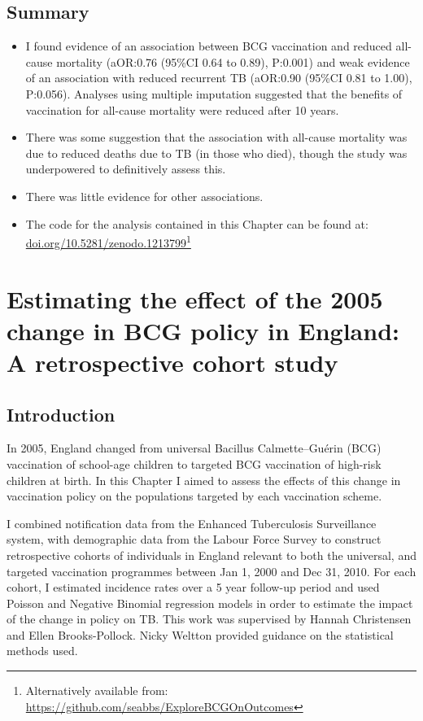 \documentclass[11pt,twoside]{bristolthesis}
\begin{document}
  \hypertarget{summary-5}{%
  \section{Summary}\label{summary-5}}
  \begin{itemize}
  \item
    I found evidence of an association between BCG vaccination and reduced all-cause mortality (aOR:0.76 (95\%CI 0.64 to 0.89), P:0.001) and weak evidence of an association with reduced recurrent TB (aOR:0.90 (95\%CI 0.81 to 1.00), P:0.056). Analyses using multiple imputation suggested that the benefits of vaccination for all-cause mortality were reduced after 10 years.
  \item
    There was some suggestion that the association with all-cause mortality was due to reduced deaths due to TB (in those who died), though the study was underpowered to definitively assess this.
  \item
    There was little evidence for other associations.
  \item
    The code for the analysis contained in this Chapter can be found at: \url{doi.org/10.5281/zenodo.1213799}\footnote{Alternatively available from: \url{https://github.com/seabbs/ExploreBCGOnOutcomes}}
  \end{itemize}
  \hypertarget{direct-eff}{%
  \chapter{Estimating the effect of the 2005 change in BCG policy in England: A retrospective cohort study}\label{direct-eff}}
  
  \hypertarget{introduction-5}{%
  \section{Introduction}\label{introduction-5}}
  
  In 2005, England changed from universal Bacillus Calmette--Guérin (BCG) vaccination of school-age children to targeted BCG vaccination of high-risk children at birth. In this Chapter I aimed to assess the effects of this change in vaccination policy on the populations targeted by each vaccination scheme.
  
  I combined notification data from the Enhanced Tuberculosis Surveillance system, with demographic data from the Labour Force Survey to construct retrospective cohorts of individuals in England relevant to both the universal, and targeted vaccination programmes between Jan 1, 2000 and Dec 31, 2010. For each cohort, I estimated incidence rates over a 5 year follow-up period and used Poisson and Negative Binomial regression models in order to estimate the impact of the change in policy on TB. This work was supervised by Hannah Christensen and Ellen Brooks-Pollock. Nicky Weltton provided guidance on the statistical methods used.
  
\end{document}
